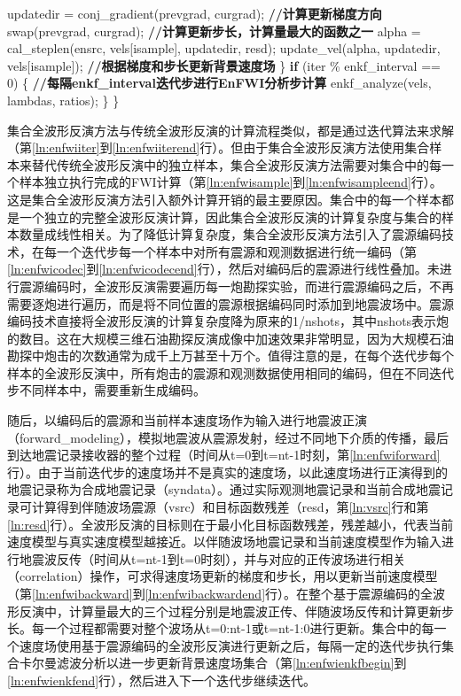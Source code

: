 \begin{algorithm}[ht]
\begin{algorithmic}[1]
\State \quad\quad\quad\quad updatedir = conj\_gradient(prevgrad, curgrad); \textbf{//计算更新梯度方向}
\State \quad\quad\quad\quad swap(prevgrad, curgrad);
\State
\State \quad\quad\quad\quad \textbf{//计算更新步长，计算量最大的函数之一}
\State \quad\quad\quad\quad alpha = cal\_steplen(ensrc, vels[isample], updatedir, resd);
\State \quad\quad\quad\quad update\_vel(alpha, updatedir, vels[isample]); \textbf{//根据梯度和步长更新背景速度场} \label{ln:enfwibackwardend}
\State \quad\quad \} \label{ln:enfwisampleend}
\State
\State \quad\quad \textbf{if} (iter \% enkf\_interval == 0) \{ \textbf{//每隔enkf\_interval迭代步进行EnFWI分析步计算} \label{ln:enfwienkfbegin}
\State \quad\quad\quad\quad enkf\_analyze(vels, lambdas, ratios);
\State \quad\quad \} \label{ln:enfwienkfend}
\State \} \label{ln:enfwiiterend}
\end{algorithmic}
\end{algorithm}

集合全波形反演方法与传统全波形反演的计算流程类似，都是通过迭代算法来求解（第\ref{ln:enfwiiter}到\ref{ln:enfwiiterend}行）。但由于集合全波形反演方法使用集合样本来替代传统全波形反演中的独立样本，集合全波形反演方法需要对集合中的每一个样本独立执行完成的FWI计算（第\ref{ln:enfwisample}到\ref{ln:enfwisampleend}行）。这是集合全波形反演方法引入额外计算开销的最主要原因。集合中的每一个样本都是一个独立的完整全波形反演计算，因此集合全波形反演的计算复杂度与集合的样本数量成线性相关。为了降低计算复杂度，集合全波形反演方法引入了震源编码技术，在每一个迭代步每一个样本中对所有震源和观测数据进行统一编码（第\ref{ln:enfwicodec}到\ref{ln:enfwicodecend}行），然后对编码后的震源进行线性叠加。未进行震源编码时，全波形反演需要遍历每一炮勘探实验，而进行震源编码之后，不再需要逐炮进行遍历，而是将不同位置的震源根据编码同时添加到地震波场中。震源编码技术直接将全波形反演的计算复杂度降为原来的1/nshots，其中nshots表示炮的数目。这在大规模三维石油勘探反演成像中加速效果非常明显，因为大规模石油勘探中炮击的次数通常为成千上万甚至十万个。值得注意的是，在每个迭代步每个样本的全波形反演中，所有炮击的震源和观测数据使用相同的编码，但在不同迭代步不同样本中，需要重新生成编码。

随后，以编码后的震源和当前样本速度场作为输入进行地震波正演（forward\_modeling），模拟地震波从震源发射，经过不同地下介质的传播，最后到达地震记录接收器的整个过程（时间从t=0到t=nt-1时刻，第\ref{ln:enfwiforward}行）。由于当前迭代步的速度场并不是真实的速度场，以此速度场进行正演得到的地震记录称为合成地震记录（syndata）。通过实际观测地震记录和当前合成地震记录可计算得到伴随波场震源（vsrc）和目标函数残差（resd，第\ref{ln:vsrc}行和第\ref{ln:resd}行）。全波形反演的目标则在于最小化目标函数残差，残差越小，代表当前速度模型与真实速度模型越接近。以伴随波场地震记录和当前速度模型作为输入进行地震波反传（时间从t=nt-1到t=0时刻），并与对应的正传波场进行相关（correlation）操作，可求得速度场更新的梯度和步长，用以更新当前速度模型（第\ref{ln:enfwibackward}到\ref{ln:enfwibackwardend}行）。在整个基于震源编码的全波形反演中，计算量最大的三个过程分别是地震波正传、伴随波场反传和计算更新步长。每一个过程都需要对整个波场从t=0:nt-1或t=nt-1:0进行更新。集合中的每一个速度场使用基于震源编码的全波形反演进行更新之后，每隔一定的迭代步执行集合卡尔曼滤波分析以进一步更新背景速度场集合（第\ref{ln:enfwienkfbegin}到\ref{ln:enfwienkfend}行），然后进入下一个迭代步继续迭代。

